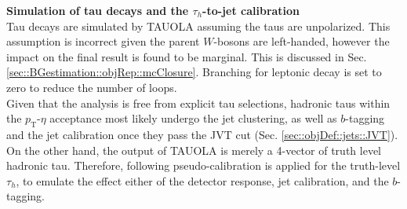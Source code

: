 \noindent \textbf{Simulation of tau decays and the $\tau_h$-to-jet calibration } \\
Tau decays are simulated by TAUOLA \cite{TAUOLA1,TAUOLA2,TAUOLA3} assuming the taus are unpolarized. This assumption is incorrect given the parent $W$-bosons are left-handed, however the impact on the final result is found to be marginal. This is discussed in Sec. \ref{sec::BGestimation::objRep::mcClosure}. Branching for leptonic decay is set to zero to reduce the number of loops. \\

Given that the analysis is free from explicit tau selections, hadronic taus within the $p_{\mathrm{T}}$-$\eta$ acceptance most likely undergo the jet clustering, as well as $b$-tagging and the jet calibration once they pass the JVT cut (Sec. \ref{sec::objDef::jets::JVT}). 
On the other hand, the output of TAUOLA is merely a 4-vector of truth level hadronic tau. 
Therefore, following pseudo-calibration is applied for the truth-level $\tau_h$, to emulate the effect either of the detector response, jet calibration, and the $b$-tagging.\\

